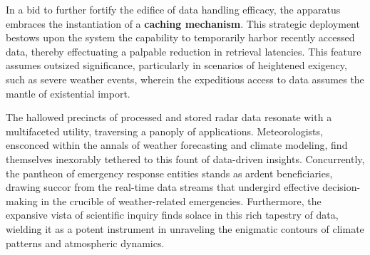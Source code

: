In a bid to further fortify the edifice of data handling efficacy, the apparatus
embraces the instantiation of a \textbf{caching mechanism}. This strategic
deployment bestows upon the system the capability to temporarily harbor recently
accessed data, thereby effectuating a palpable reduction in retrieval latencies.
This feature assumes outsized significance, particularly in scenarios of
heightened exigency, such as severe weather events, wherein the expeditious
access to data assumes the mantle of existential import.

The hallowed precincts of processed and stored radar data resonate with a
multifaceted utility, traversing a panoply of applications. Meteorologists,
ensconced within the annals of weather forecasting and climate modeling, find
themselves inexorably tethered to this fount of data-driven insights.
Concurrently, the pantheon of emergency response entities stands as ardent
beneficiaries, drawing succor from the real-time data streams that undergird
effective decision-making in the crucible of weather-related emergencies.
Furthermore, the expansive vista of scientific inquiry finds solace in this rich
tapestry of data, wielding it as a potent instrument in unraveling the enigmatic
contours of climate patterns and atmospheric dynamics.
